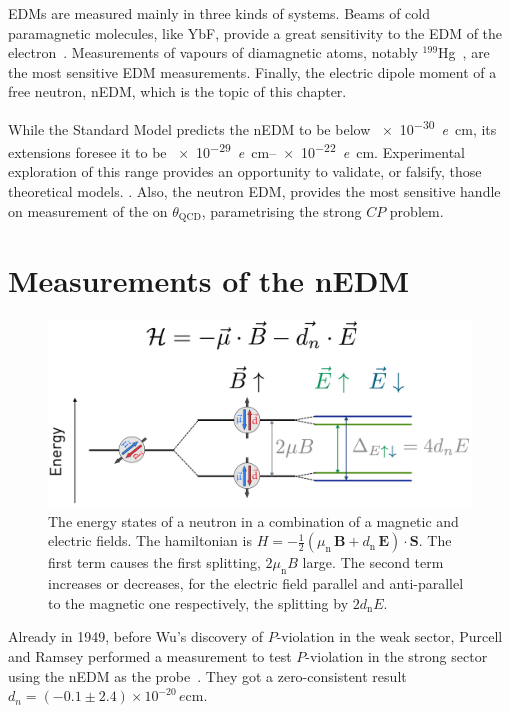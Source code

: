 EDMs are measured mainly in three kinds of systems. Beams of cold paramagnetic molecules, like YbF, provide a great sensitivity to the EDM of the electron~\cite{Hudson2011}. Measurements of vapours of diamagnetic atoms, notably $^{199}$Hg~\cite{PhysRevLett.116.161601}, are the most sensitive EDM measurements. Finally, the electric dipole moment of a free neutron, nEDM, which is the topic of this chapter.

While the Standard Model predicts the nEDM to be below \SI{e-30}{\elementarycharge\centi\meter}, its extensions foresee it to be \SIrange[range-phrase=--,range-units=single]{e-29}{e-22}{\elementarycharge\centi\meter}. Experimental exploration of this range provides an opportunity to validate, or falsify, those theoretical models. . Also, the neutron EDM, provides the most sensitive handle on measurement of the on $\theta_\text{QCD}$, parametrising the strong $CP$ problem.



\section{Measurements of the nEDM}

\begin{figure}
  \centering
  \includegraphics[width=\linewidth]{gfx/nEDMatPSI/measurement_principle.png}
  \caption{The energy states of a neutron in a combination of a magnetic and electric fields. The hamiltonian is $H = - \frac{1}{2} \left( \mu_\text{n} \, \bm{B} + d_\text{n} \, \bm{E} \right ) \cdot \bm{S}$. The first term causes the first splitting, $2\mu_\text{n} B$ large. The second term increases or decreases, for the electric field parallel and anti-parallel to the magnetic one respectively, the splitting by $2 d_\text{n} E$.}
  \label{fig:nEDM_measurement_principle}
\end{figure}

Already in 1949, before Wu's discovery of $P$-violation in the weak sector, Purcell and Ramsey performed a measurement to test $P$-violation in the strong sector using the nEDM as the probe~\cite{PhysRev.108.120}. They got a zero-consistent result $d_n = (-0.1 \pm 2.4) \times 10^{-20}\,\si{\elementarycharge\centi\meter}$.

